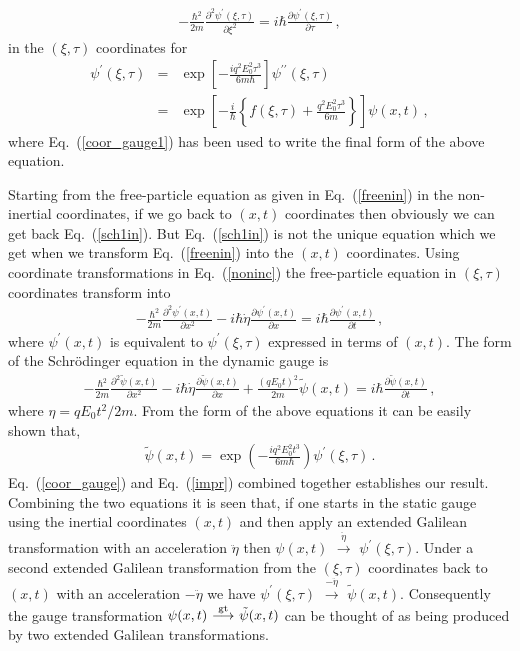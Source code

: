 \documentclass[12pt]{article}
\begin{document}
%
\begin{eqnarray}
-\frac{\hbar^2}{2m}\frac{\partial^2 \psi^\prime(\xi,\tau)}{\partial \xi^2}
 =i\hbar\frac{\partial 
\psi^{\prime}(\xi, \tau)}{\partial \tau}\,,
\label{freenin}
\end{eqnarray}
%
in the $(\xi, \tau)$ coordinates for 
%
\begin{eqnarray}
\psi^{\prime}(\xi, \tau)&=&\exp\left[-\frac{iq^2E_0^2\tau^3}{6m\hbar}\right]
\psi^{\prime\prime}(\xi,\tau)\nonumber\\
&=&\exp\left[-\frac{i}{\hbar}\left\{f(\xi,\tau) + \frac{q^2E_0^2\tau^3}{6m}
\right\}\right]\psi(x,t)\,,
\label{coor_gauge}
\end{eqnarray}
%
where Eq.~(\ref{coor_gauge1}) has been used to write the final form of the
above equation.

Starting from the free-particle equation as given in Eq.~(\ref{freenin}) in
the non-inertial coordinates, if we go back to $(x,t)$ coordinates then
obviously we can get back Eq.~(\ref{sch1in}). But Eq.~(\ref{sch1in}) is not
the unique equation which we get when we transform Eq.~(\ref{freenin}) into
the $(x,t)$ coordinates. Using coordinate transformations in
Eq.~(\ref{noninc}) the free-particle equation in $(\xi, \tau)$ coordinates
transform into
%
\begin{eqnarray}
-\frac{\hbar^2}{2m}\frac{\partial^2 \psi^\prime(x,t)}{\partial x^2} -
i \hbar \dot{\eta}\frac{\partial \psi^\prime(x,t)}{\partial x} 
=i\hbar \frac{\partial \psi^\prime(x,t)}{\partial t}\,, 
\label{schdyn1}
\end{eqnarray}
%
where $\psi^\prime(x,t)$ is equivalent to $\psi^\prime(\xi,\tau)$
expressed in terms of $(x,t)$. The form of the Schr\"{o}dinger
equation in the dynamic gauge is
%
\begin{eqnarray}
-\frac{\hbar^2}{2m}\frac{\partial^2 {\tilde \psi}(x,t)}{\partial x^2} -
i \hbar \dot{\eta}\frac{\partial {\tilde \psi}(x,t)}{\partial x} 
+ \frac{(qE_0t)^2}{2m}{\tilde \psi(x,t)}
=i\hbar \frac{\partial {\tilde \psi}(x,t)}{\partial t}\,, 
\label{schdyn2}
\end{eqnarray}
%
where $\eta=qE_0t^2/2m$. From the  form of the above equations it 
can be easily shown that,
%
\begin{eqnarray}
{\tilde \psi}(x,t)=\exp\left(-\frac{iq^2 E_0^2 t^3}{6m\hbar}\right)
\psi^\prime(\xi,\tau)\,.
\label{impr}
\end{eqnarray}
%
Eq.~(\ref{coor_gauge}) and Eq.~(\ref{impr}) combined together
establishes our result. Combining the two equations it is seen that,
if one starts in the static gauge using the inertial coordinates
$(x,t)$ and then apply an extended Galilean transformation with an
acceleration $\ddot{\eta}$ then 
$\psi(x,t)\,\,{\stackrel{\ddot{\eta}}\longrightarrow}\,\,\psi^\prime
(\xi,\tau)$. Under a second extended Galilean
transformation from the $(\xi,\tau)$ coordinates back to $(x,t)$ with
an acceleration $-{\ddot\eta}$ we have 
$\psi^\prime(\xi,\tau)\,\,{\stackrel{-\ddot{\eta}}\longrightarrow}\,\,
{\tilde\psi(x,t)}$. Consequently the gauge transformation $\psi(x,t)
\,\,{\stackrel{\rm gt}\longrightarrow}\,\,{\tilde \psi(x,t)}$ can be 
thought of as being produced by two extended Galilean transformations.
\end{document}
